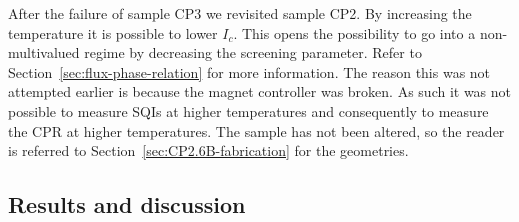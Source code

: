 After the failure of sample CP3 we revisited sample CP2. By increasing the temperature it is possible to lower $I_c$. This opens the possibility to go into a non-multivalued regime by decreasing the screening parameter. Refer to Section~\ref{sec:flux-phase-relation} for more information. The reason this was not attempted earlier is because the magnet controller was broken. As such it was not possible to measure SQIs at higher temperatures and consequently to measure the CPR at higher temperatures. The sample has not been altered, so the reader is referred to Section~\ref{sec:CP2.6B-fabrication} for the geometries.

\subsection{Results and discussion}
